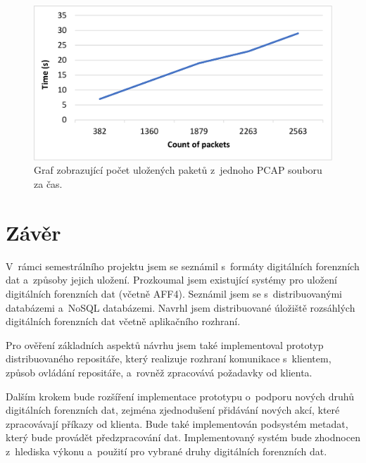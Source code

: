 \begin{figure}[!h]
  \centering
  \includegraphics[width=15cm]{template-fig/PerformanceChart.pdf}
  \caption{Graf zobrazující počet uložených paketů z~jednoho PCAP souboru za čas.}
  \label{FIG_PerformanceChart}
\end{figure}



\chapter{Závěr}
V~rámci semestrálního projektu jsem se seznámil s~formáty digitálních forenzních dat a~způsoby jejich uložení. Prozkoumal jsem existující systémy pro uložení digitálních forenzních dat (včetně AFF4). Seznámil jsem se s~distribuovanými databázemi a~NoSQL databázemi. Navrhl jsem distribuované úložiště rozsáhlých digitálních forenzních dat včetně aplikačního rozhraní.

Pro ověření základních aspektů návrhu jsem také implementoval prototyp distribuovaného repositáře, který realizuje rozhraní komunikace s~klientem, způsob ovládání repositáře, a~rovněž zpracovává požadavky od klienta.

Dalším krokem bude rozšíření implementace prototypu o~podporu nových druhů digitálních forenzních dat, zejména zjednodušení přidávání nových akcí, které zpracovávají příkazy od klienta. Bude také implementován podsystém metadat, který bude provádět předzpracování dat.
Implementovaný systém bude zhodnocen z~hlediska výkonu a~použití pro vybrané druhy digitálních forenzních dat.

